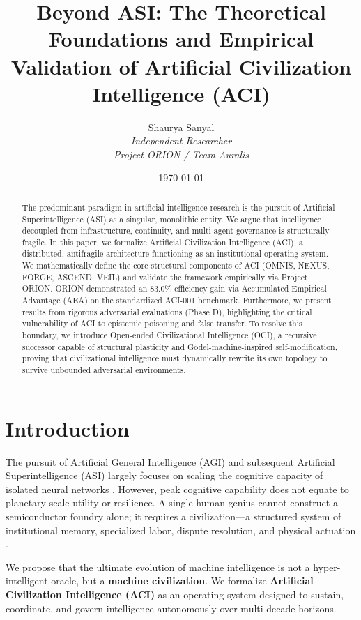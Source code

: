 \documentclass[11pt,twocolumn]{article}
\title{\LARGE \bf Beyond ASI: The Theoretical Foundations and Empirical Validation of Artificial Civilization Intelligence (ACI)}
\author{Shaurya Sanyal \\ \textit{Independent Researcher} \\ \textit{Project ORION / Team Auralis}}
\date{\today}
\begin{document}
\maketitle

\begin{abstract}
The predominant paradigm in artificial intelligence research is the pursuit of Artificial Superintelligence (ASI) as a singular, monolithic entity. We argue that intelligence decoupled from infrastructure, continuity, and multi-agent governance is structurally fragile. In this paper, we formalize Artificial Civilization Intelligence (ACI), a distributed, antifragile architecture functioning as an institutional operating system. We mathematically define the core structural components of ACI (OMNIS, NEXUS, FORGE, ASCEND, VEIL) and validate the framework empirically via Project ORION. ORION demonstrated an 83.0\% efficiency gain via Accumulated Empirical Advantage (AEA) on the standardized ACI-001 benchmark. Furthermore, we present results from rigorous adversarial evaluations (Phase D), highlighting the critical vulnerability of ACI to epistemic poisoning and false transfer. To resolve this boundary, we introduce Open-ended Civilizational Intelligence (OCI), a recursive successor capable of structural plasticity and G\"odel-machine-inspired self-modification, proving that civilizational intelligence must dynamically rewrite its own topology to survive unbounded adversarial environments.
\end{abstract}

\section{Introduction}
\label{sec:intro}
The pursuit of Artificial General Intelligence (AGI) and subsequent Artificial Superintelligence (ASI) largely focuses on scaling the cognitive capacity of isolated neural networks \cite{sutton2018reinforcement}. However, peak cognitive capability does not equate to planetary-scale utility or resilience. A single human genius cannot construct a semiconductor foundry alone; it requires a civilization---a structured system of institutional memory, specialized labor, dispute resolution, and physical actuation \cite{hutter2004universal}. 

We propose that the ultimate evolution of machine intelligence is not a hyper-intelligent oracle, but a \textbf{machine civilization}. We formalize \textbf{Artificial Civilization Intelligence (ACI)} as an operating system designed to sustain, coordinate, and govern intelligence autonomously over multi-decade horizons.
\end{document}
